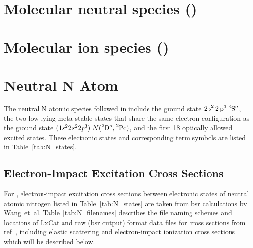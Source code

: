 \section{Molecular neutral species ()}
\tbd

\section{Molecular ion species ()}
\tbd


\section{Neutral N Atom}

The neutral N atomic species followed in \bpcmn{} include
the ground state $\ce{2s^2 2p^3}\;\ce{^4S^o}$, the two low lying meta stable states
that share the same electron configuration as the ground state
$(1s^22s^22p^3)\; N(\ce{^2D^o}, \ce{^2Po})$, and the first 18 optically allowed 
excited states.  These electronic states and corresponding term symbols
are listed in Table~\ref{tab:N_states}. 

\subsection{Electron-Impact Excitation Cross Sections}

For \bpcmn{}, electron-impact excitation
cross sections between electronic 
states of neutral
atomic nitrogen listed in Table~\ref{tab:N_states} are taken from \ac{bsr}
calculations by Wang~et~al.\cite{wang2014} 
Table~\ref{tab:N_filenames} describes the file naming schemes and locations of LxCat and raw (\ac{bsr} output)
format data files for cross sections from ref~\cite{wang2014}, including elastic scattering and electron-impact 
ionization cross sections which will be described below. \\

